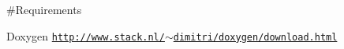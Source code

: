 \#\+Requirements

Doxygen \href{http://www.stack.nl/~dimitri/doxygen/download.html}{\tt http\+://www.\+stack.\+nl/$\sim$dimitri/doxygen/download.\+html} 
 